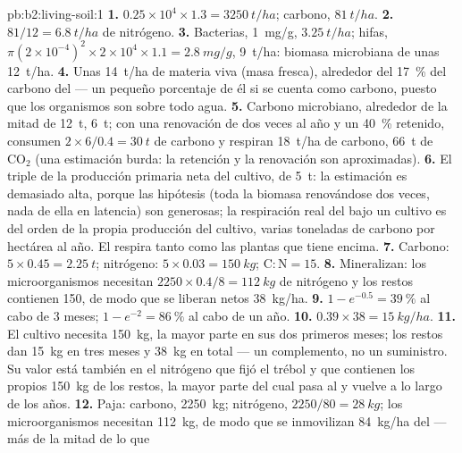 \begin{solution}{pb:b2:living-soil:1}
\textbf{1.} $0.25\times 10^{4}\times 1.3 = \qty{3250}{t/ha}$;
carbono, $\qty{81}{t/ha}$.
\textbf{2.} $81/12 = \qty{6.8}{t/ha}$ de nitrógeno.
\textbf{3.} Bacterias, \qty{1}{mg/g}, $\qty{3.25}{t/ha}$; hifas,
$\pi(2\times 10^{-4})^{2}\times 2\times 10^{4}\times 1.1 =
\qty{2.8}{mg/g}$, \qty{9}{t/ha}: biomasa microbiana de unas
\qty{12}{t/ha}.
\textbf{4.} Unas \qty{14}{t/ha} de materia viva (masa fresca), alrededor
del \qty{17}{\%} del carbono del  --- un pequeño porcentaje de él si
se cuenta como carbono, puesto que los organismos son sobre todo agua.
\textbf{5.} Carbono microbiano, alrededor de la mitad de \qty{12}{t},
\qty{6}{t}; con una renovación de dos veces al año y un \qty{40}{\%}
retenido, consumen $2\times 6/0.4 = \qty{30}{t}$ de carbono y respiran
\qty{18}{t/ha} de carbono, \qty{66}{t} de $\mathrm{CO_2}$ (una estimación
burda: la retención y la renovación son aproximadas).
\textbf{6.} El triple de la producción primaria neta del cultivo, de
\qty{5}{t}: la estimación es demasiado alta, porque las hipótesis (toda la
biomasa renovándose dos veces, nada de ella en latencia) son generosas; la
respiración real del  bajo un cultivo es del orden de la propia
producción del cultivo, varias toneladas de carbono por hectárea al año.
El  respira tanto como las plantas que tiene encima.
\textbf{7.} Carbono: $5\times 0.45 = \qty{2.25}{t}$; nitrógeno: $5\times
0.03 = \qty{150}{kg}$; $\mathrm{C:N} = 15$.
\textbf{8.} Mineralizan: los microorganismos necesitan $2250\times 0.4/8 =
\qty{112}{kg}$ de nitrógeno y los restos contienen 150, de modo que se
liberan netos \qty{38}{kg/ha}.
\textbf{9.} $1 - e^{-0.5} = \qty{39}{\%}$ al cabo de 3 meses; $1 - e^{-2}
= \qty{86}{\%}$ al cabo de un año.
\textbf{10.} $0.39\times 38 = \qty{15}{kg/ha}$.
\textbf{11.} El cultivo necesita \qty{150}{kg}, la mayor parte en sus dos
primeros meses; los restos dan \qty{15}{kg} en tres meses y \qty{38}{kg}
en total --- un complemento, no un suministro. Su valor está también en el
nitrógeno que fijó el trébol y que contienen los propios \qty{150}{kg} de
los restos, la mayor parte del cual pasa al  y vuelve a lo largo de
los años.
\textbf{12.} Paja: carbono, \qty{2250}{kg}; nitrógeno, $2250/80 =
\qty{28}{kg}$; los microorganismos necesitan \qty{112}{kg}, de modo que se
inmovilizan \qty{84}{kg/ha} del  --- más de la mitad de lo que

\end{solution}
